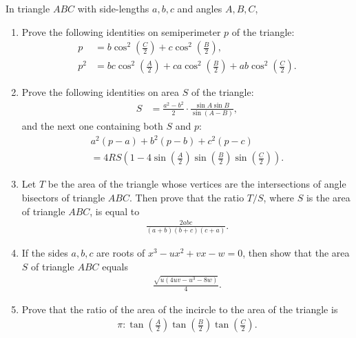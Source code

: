 \documentclass[12pt,a4paper]{memoir}
\theoremstyle{definition}
\begin{document}
	\begin{question}[name={Makshud's Identities on Area and Semiperimeter}]
		In triangle $ABC$ with side-lengths $a,b,c$ and angles $A,B,C$, 
		\begin{enumerate}
			\item Prove the following identities on semiperimeter $p$ of the triangle:
			\begin{align*}
				p&= b\cos^2\left(\frac{C}{2}\right)+c\cos^2\left(\frac{B}{2}\right),\\
				p^2&= bc\cos^2\left(\frac{A}{2}\right)+ca\cos^2\left(\frac{B}{2}\right)+ab\cos^2\left(\frac{C}{2}\right).
			\end{align*}
			\item Prove the following identities on area $S$ of the triangle:
			\begin{align*}
				S &= \frac{a^2-b^2}{2}\cdot\frac{\sin A \sin B}{\sin(A-B)},
			\end{align*}
			and the next one containing both $S$ and $p$:
			\begin{multline*}
				a^2(p-a)+b^2(p-b)+c^2(p-c) \\ = 4RS\left(1-4\sin\left(\frac{A}{2}\right)\sin\left(\frac{B}{2}\right)\sin\left(\frac{C}{2}\right)\right).
			\end{multline*}
			\item Let $T$ be the area of the triangle whose vertices are the intersections of angle bisectors of triangle $ABC$. Then prove that the ratio $T/S$, where $S$ is the area of triangle $ABC$, is equal to
			\begin{align*}
				\frac{2abc}{(a+b)(b+c)(c+a)}.
			\end{align*}
			\item If the sides $a,b,c$ are roots of $x^3-ux^2+vx-w=0$, then show that the area $S$ of triangle $ABC$ equals
			\begin{align*}
				\frac{\sqrt{u(4uv-u^3-8w)}}{4}.
			\end{align*}
			\item Prove that the ratio of the area of the incircle to the area of the triangle is
			\begin{align*}
				\pi:\tan\left(\frac{A}{2}\right)\tan\left(\frac{B}{2}\right)\tan\left(\frac{C}{2}\right).
			\end{align*}
		\end{enumerate}
	\end{question}
\end{document}
